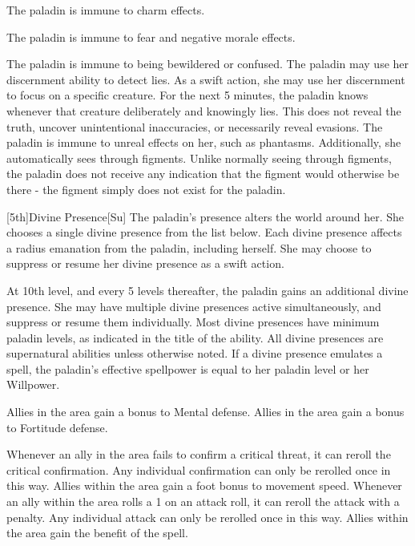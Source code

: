 The paladin is immune to charm effects.

The paladin is immune to fear and negative morale effects.

The paladin is immune to being bewildered or confused.
The paladin may use her discernment ability to detect lies.
As a swift action, she may use her discernment to focus on a specific creature.
For the next 5 minutes, the paladin knows whenever that creature deliberately and knowingly lies.
This does not reveal the truth, uncover unintentional inaccuracies, or necessarily reveal evasions.
The paladin is immune to unreal effects on her, such as phantasms.
Additionally, she automatically sees through figments.
Unlike normally seeing through figments, the paladin does not receive any indication that the figment would otherwise be there - the figment simply does not exist for the paladin.

[5th]{Divine Presence}[Su]
The paladin's presence alters the world around her.
She chooses a single divine presence from the list below.
Each divine presence affects a \arealarge radius emanation from the paladin, including herself.
She may choose to suppress or resume her divine presence as a swift action.

At 10th level, and every 5 levels thereafter, the paladin gains an additional divine presence.
She may have multiple divine presences active simultaneously, and suppress or resume them individually.
Most divine presences have minimum paladin levels, as indicated in the title of the ability.
All divine presences are supernatural abilities unless otherwise noted.
If a divine presence emulates a spell, the paladin's effective spellpower is equal to her paladin level or her Willpower.

Allies in the area gain a  bonus to Mental defense.
Allies in the area gain a  bonus to Fortitude defense.

Whenever an ally in the area fails to confirm a critical threat, it can reroll the critical confirmation.
Any individual confirmation can only be rerolled once in this way.
Allies within the area gain a  foot bonus to movement speed.
Whenever an ally within the area rolls a 1 on an attack roll, it can reroll the attack with a  penalty.
Any individual attack can only be rerolled once in this way.
 Allies within the area gain the benefit of the 
spell.

